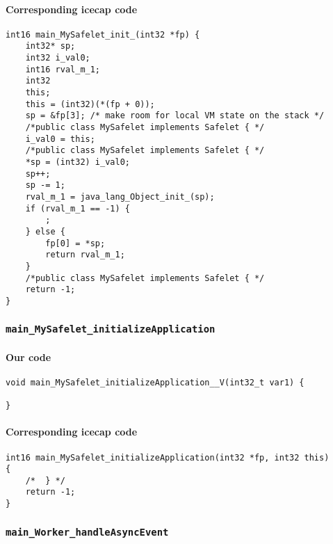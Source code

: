 \paragraph{Corresponding icecap code}\hfill
\begin{lstlisting}[firstnumber=54391]
int16 main_MySafelet_init_(int32 *fp) {
	int32* sp;
	int32 i_val0;
	int16 rval_m_1;
	int32
	this;
	this = (int32)(*(fp + 0));
	sp = &fp[3]; /* make room for local VM state on the stack */
	/*public class MySafelet implements Safelet { */
	i_val0 = this;
	/*public class MySafelet implements Safelet { */
	*sp = (int32) i_val0;
	sp++;
	sp -= 1;
	rval_m_1 = java_lang_Object_init_(sp);
	if (rval_m_1 == -1) {
		;
	} else {
		fp[0] = *sp;
		return rval_m_1;
	}
	/*public class MySafelet implements Safelet { */
	return -1;
}
\end{lstlisting}

\subsubsection{\texttt{main\_MySafelet\_initializeApplication}}

\paragraph{Our code}\hfill
\begin{lstlisting}[firstnumber=2184]
void main_MySafelet_initializeApplication__V(int32_t var1) {
	
}
\end{lstlisting}

\paragraph{Corresponding icecap code}\hfill
\begin{lstlisting}[firstnumber=54461]
int16 main_MySafelet_initializeApplication(int32 *fp, int32 this)
{
	/*	} */
	return -1;
}
\end{lstlisting}

\subsubsection{\texttt{main\_Worker\_handleAsyncEvent}}

